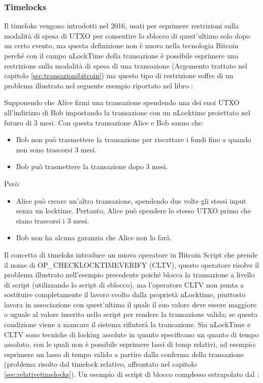 \subsubsection{Timelocks}

Il timeloks vengono introdotti nel 2016, usati per esprimere restrizioni sulla modalità di spesa di UTXO per consentire lo sblocco di quest’ultimo solo dopo un certo evento, ma questa definizione non è nuova nella tecnologia Bitcoin perché con il campo nLockTime della transazione è possibile esprimere una restrizione sulla modalità di spesa di una transazione (Argomento trattato nel capitolo \ref{sec:transazionibitcoin}) ma questo tipo di restrizione soffre di un problema illustrato nel seguente esempio riportato nel libro \cite{bitcoinbook}:

Supponendo che Alice firmi una transazione spendendo una dei suoi UTXO all'indirizzo di Bob impostando la transazione con un nLocktime proiettato nel futuro di 3 mesi.
Con questa transazione Alice e Bob sanno che:
\begin{itemize}
  \item Bob non può trasmettere la transazione per riscattare i fondi fino a quando non sono trascorsi 3 mesi.
  \item Bob può trasmettere la transazione dopo 3 mesi.
\end{itemize}
Però:
\begin{itemize}
  \item Alice può creare un'altra transazione, spendendo due volte gli stessi input senza un locktime. Pertanto, Alice può spendere lo stesso UTXO prima che siano trascorsi i 3 mesi.
  \item Bob non ha alcuna garanzia che Alice non lo farà.
\end{itemize}
Il concetto di timeloks introduce un nuovo operatore in Bitcoin Script che prende il nome di OP\_CHECKLOCKTIMEVERIFY (CLTV), questo operatore risolve il problema illustrato nell’esempio precedente poiché blocca la  transazione a livello di script (utilizzando lo script di sblocco), ma l’operatore CLTV non punta a sostituire completamente il lavoro svolto dalla proprietà nLocktime, piuttosto lavora in associazione con quest’ultimo il quale il suo valore deve essere maggiore o uguale al valore inserito nello script per rendere la transazione valida; se questa condizione viene a mancare il sistema rifiuterà la transazione.
Sia nLockTime e CLTV sono tecniche di locking assolute in quanto specificano un quanto di tempo assoluto, con le quali non è possibile esprimere lassi di temp relativi, ad esempio: esprimere un lasso di tempo valido a partire dalla conferma della transazione (problema risolto dal timelock relativo, affrontato nel capitolo \ref{sec:relativetimelocks}).
Un esempio di script di blocco complesso estrapolato dal \cite{bitcoinbip:bip68}:

